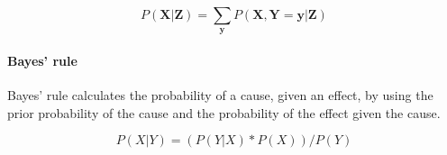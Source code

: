 \documentclass{article}
\begin{document}
\begin{appendices}
\begin{equation}
P(\boldsymbol X |\boldsymbol Z ) = \sum_{\boldsymbol y}   P(\boldsymbol X ,\boldsymbol Y =\boldsymbol y |\boldsymbol Z )
\end{equation} 

\paragraph{Bayes' rule}

Bayes' rule calculates the probability of a cause, given an effect, by using the prior probability of the cause and the probability of the effect given the cause. 

\begin{equation}
P(X|Y) = ( P(Y|X) * P(X) ) / P(Y)
\end{equation}
\end{appendices}
	
\end{document}
